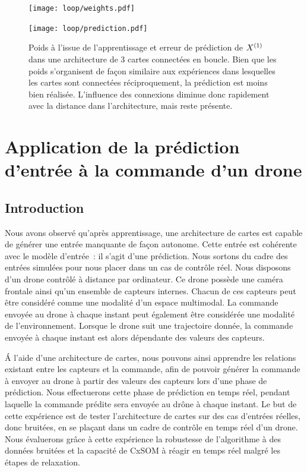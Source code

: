 \documentclass[../main]{subfiles}
\begin{document}
\begin{figure}[h!]
	\begin{minipage}{\textwidth}
		\centering\texttt{[image: loop/weights.pdf]}
	\end{minipage}
	\begin{minipage}{\textwidth}
		\centering\texttt{[image: loop/prediction.pdf]}
		\caption{Poids à l'issue de l'apprentissage et erreur de prédiction de $X^{({1})}$ dans une architecture de 3 cartes connectées en boucle. Bien que les poids s'organisent de façon similaire aux expériences dans lesquelles les cartes sont connectées réciproquement, la prédiction est moins bien réalisée. L'influence des connexions diminue donc rapidement avec la distance dans l'architecture, mais reste présente.\label{fig:3som_loop}}
	\end{minipage}
\end{figure}



\section{Application de la prédiction d'entrée à la commande d'un drone}

\subsection{Introduction}

Nous avons observé qu'après apprentissage, une architecture de cartes est capable de générer une entrée manquante de façon autonome. Cette entrée est cohérente avec le modèle d'entrée~: il s'agit d'une prédiction.
Nous sortons du cadre des entrées simulées pour nous placer dans un cas de contrôle réel.
Nous disposons d'un drone contrôlé à distance par ordinateur. Ce drone possède une caméra frontale ainsi qu'un ensemble de capteurs internes. Chacun de ces capteurs peut être considéré comme une modalité d'un espace multimodal. La commande envoyée au drone à chaque instant peut également être considérée une modalité de l'environnement. Lorsque le drone suit une trajectoire donnée, la commande envoyée à chaque instant est alors dépendante des valeurs des capteurs.


\'A l'aide d'une architecture de cartes, nous pouvons ainsi apprendre les relations existant entre les capteurs et la commande, afin de pouvoir générer la commande à envoyer au drone à partir des valeurs des capteurs lors d'une phase de prédiction.
Nous effectuerons cette phase de prédiction en temps réel, pendant laquelle la commande prédite sera envoyée au drône à chaque instant.
Le but de cette expérience est de tester l'architecture de cartes sur des cas d'entrées réelles, donc bruitées, en se plaçant dans un cadre de contrôle en temps réel d'un drone.
Nous évaluerons grâce à cette expérience la robustesse de l'algorithme à des données bruitées et la capacité de CxSOM à réagir en temps réel malgré les étapes de relaxation.
\end{document}
